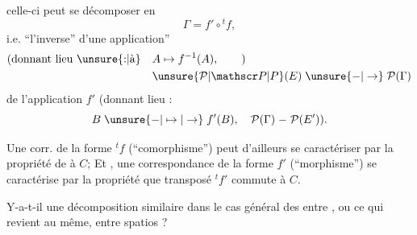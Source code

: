 

celle-ci peut se décomposer en
\[
\Gamma=f'\circ{}^{t}f,
\]
i.e. ``l'inverse'' d'une application'' 
\[
\begin{aligned}
\text{(donnant lieu \unsure{:|à}} &\quad A\mapsto f^{-1}(A),\qquad\text{)}\\
&\quad \unsure{\mathcal P|\mathscr P|P}(E)\mathrel{\unsure{-|\to}}\mathcal P(\Gamma)
\end{aligned}
\]
 de l'application $f'$ (donnant lieu :
\[
B\mathrel{\unsure{-|\mapsto|\to}}f'(B),\quad
\mathcal P(\Gamma)\mathrel{-}\mathcal P(E')\text{).}
\]

Une corr. de la forme $ {}^{t}f$  (``comorphisme'') peut d'ailleurs se caractériser  par la propriété de  à $C$; Et , une correspondance de la forme $f'$ (``morphisme'') se caractérise par la propriété que  transposé $ {}^{t}f'$ commute à $C$.

Y-a-t-il une décomposition similaire dans le cas général des   entre , ou ce qui revient au même, entre spatios ?
